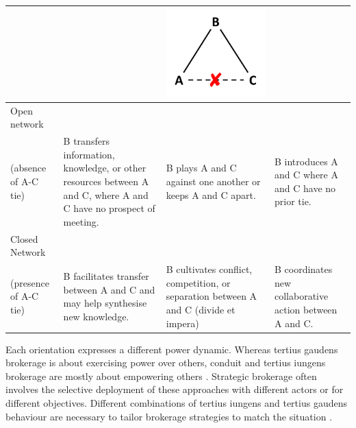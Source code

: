 \begin{table}
{\begin{threeparttable}
\begin{tabular*}{\textwidth}{>{\raggedright}p{5cm}>{\raggedright\arraybackslash}p{6cm}>{\raggedright\arraybackslash}p{6cm}>{\raggedright\arraybackslash}p{6cm}}
&  & \begin{minipage}{0.2\textwidth} \centering \includegraphics[width=0.7\linewidth]{Images/TG_brokerage_2} \end{minipage}  & \\
\midrule
Open network\\(absence of A-C tie) & B transfers information, knowledge, or other resources between A and C, where A and C have no prospect of meeting. & B plays A and C against one another or keeps A and C apart. & B introduces A and C where A and C have no prior tie. \\
\midrule
Closed Network\\(presence of A-C tie) & B facilitates transfer between A and C and may help synthesise new knowledge. & B cultivates conflict, competition, or separation between A and C (divide et impera) & B coordinates new collaborative action between A and C.  \\ 
\bottomrule
\end{tabular*}
\end{threeparttable}
}
\end{table}

Each orientation expresses a different power dynamic. Whereas tertius gaudens brokerage is about exercising power over others, conduit and tertius iungens brokerage are mostly about empowering others \citep{fleming2007collaborative,obstfeld2014brokerage}. Strategic brokerage often involves the selective deployment of these approaches with different actors or for different objectives. Different combinations of tertius iungens and tertius gaudens behaviour are necessary to tailor brokerage strategies to match the situation \citep{lingo2010nexus,obstfeld2014brokerage,quintane2016brokers}. \medskip

